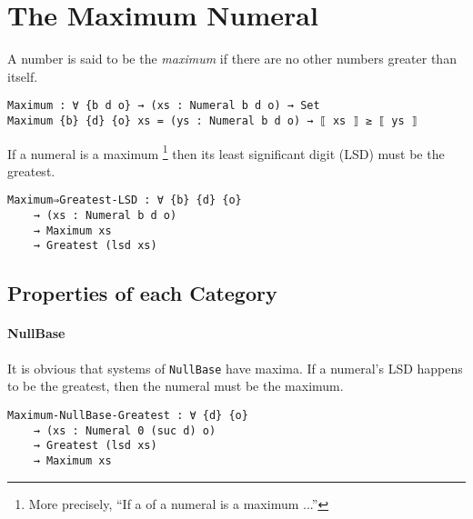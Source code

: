 \documentclass[\main/thesis.tex]{subfiles}
\begin{document}
\section{The Maximum Numeral}\label{maximum}

A number is said to be the \textit{maximum} if there are no other numbers greater
than itself.

\begin{lstlisting}
Maximum : ∀ {b d o} → (xs : Numeral b d o) → Set
Maximum {b} {d} {o} xs = (ys : Numeral b d o) → ⟦ xs ⟧ ≥ ⟦ ys ⟧
\end{lstlisting}

If a numeral is a maximum
\footnote{More precisely, ``If a  of a numeral is a maximum ...''}
 then its least significant digit (LSD) must be the
greatest.

\begin{lstlisting}
Maximum⇒Greatest-LSD : ∀ {b} {d} {o}
    → (xs : Numeral b d o)
    → Maximum xs
    → Greatest (lsd xs)
\end{lstlisting}

\subsection{Properties of each Category}

\paragraph{NullBase}

\begin{center}
\end{center}

It is obvious that systems of {\lstinline|NullBase|} have maxima.
If a numeral's LSD happens to be the greatest,
then the numeral must be the maximum.

\begin{lstlisting}
Maximum-NullBase-Greatest : ∀ {d} {o}
    → (xs : Numeral 0 (suc d) o)
    → Greatest (lsd xs)
    → Maximum xs
\end{lstlisting}
\end{document}
